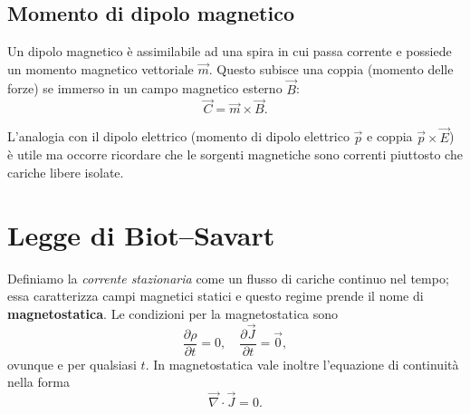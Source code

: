 \documentclass{book}
\begin{document}
\subsection{Momento di dipolo magnetico}

Un dipolo magnetico è assimilabile ad una spira in cui passa corrente e possiede un momento magnetico vettoriale $\vec m$. Questo subisce una coppia (momento delle forze) se immerso in un campo magnetico esterno $\vec B$:
$$
\vec C = \vec m \times \vec B.
$$

L'analogia con il dipolo elettrico (momento di dipolo elettrico $\vec p$ e coppia $\vec p\times\vec E$) \`e utile ma occorre ricordare che le sorgenti magnetiche sono correnti piuttosto che cariche libere isolate.

\section{Legge di Biot--Savart}

Definiamo la \textit{corrente stazionaria} come un flusso di cariche continuo nel tempo; essa caratterizza campi magnetici statici e questo regime prende il nome di \textbf{magnetostatica}. Le condizioni per la magnetostatica sono
\[
\frac{\partial \rho}{\partial t}=0,\quad \frac{\partial \vec{J}}{\partial t}= \vec{0},
\]
ovunque e per qualsiasi $t$. In magnetostatica vale inoltre l'equazione di continuit\`a nella forma
\[
\vec{\nabla}\cdot\vec J = 0.
\]
\end{document}
